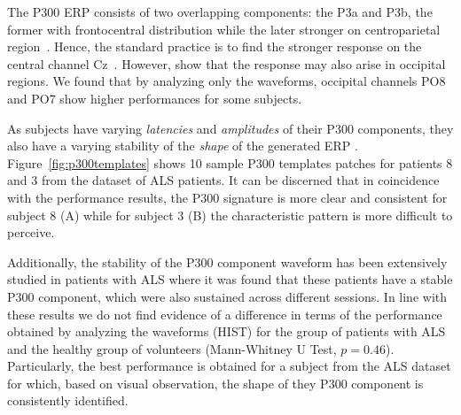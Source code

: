 \documentclass[utf8]{frontiersSCNS} %
\begin{document}

The P300 ERP  consists of two overlapping components: the P3a and P3b, the former with frontocentral distribution while the later stronger on centroparietal region~\citep{Polich2007}. Hence, the standard practice is to find the stronger response on the central channel Cz~\citep{Riccio2013}. However, \cite{Krusienski2006} show that the response may also arise in occipital regions.  We found that by analyzing only the waveforms, occipital channels PO8 and PO7 show higher performances for some subjects. 


As subjects have varying \textit{latencies} and \textit{amplitudes} of their P300 components, they also have a varying stability of the \textit{shape} of the generated ERP \citep{Nam2010}.  Figure~\ref{fig:p300templates} shows 10 sample P300 templates patches for patients 8 and 3 from the dataset of ALS patients. It can be discerned that in coincidence with the performance results, the P300 signature is more clear and consistent for subject 8 (A) while for subject 3 (B) the characteristic pattern is more difficult to perceive.

Additionally, the stability of the P300 component waveform has been extensively studied in patients with ALS \citep{SellersandEmanuelDonchin2006,TomohiroMadarame2008,Nijboer2009,Mak2012,McCane2015} where it was found that these patients have a stable P300 component, which were also sustained across different sessions.  In line with these results we do not find evidence of a difference in terms of the performance obtained by analyzing the waveforms (HIST) for the group of patients with ALS and the healthy group of volunteers (Mann-Whitney U Test, $p=0.46$). Particularly, the best performance is obtained for a subject from the ALS dataset for which, based on visual observation, the shape of they P300 component is consistently identified.

\end{document}
